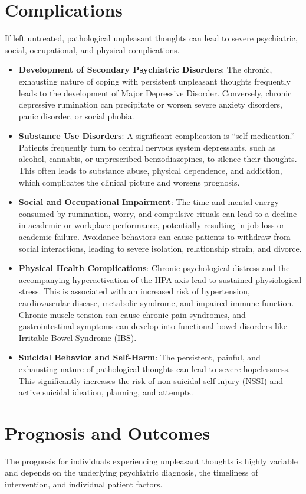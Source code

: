 \section*{Complications}
If left untreated, pathological unpleasant thoughts can lead to severe psychiatric, social, occupational, and physical complications.
\begin{itemize}
  \item \textbf{Development of Secondary Psychiatric Disorders}: The chronic, exhausting nature of coping with persistent unpleasant thoughts frequently leads to the development of Major Depressive Disorder. Conversely, chronic depressive rumination can precipitate or worsen severe anxiety disorders, panic disorder, or social phobia.
  \item \textbf{Substance Use Disorders}: A significant complication is ``self-medication.'' Patients frequently turn to central nervous system depressants, such as alcohol, cannabis, or unprescribed benzodiazepines, to silence their thoughts. This often leads to substance abuse, physical dependence, and addiction, which complicates the clinical picture and worsens prognosis.
  \item \textbf{Social and Occupational Impairment}: The time and mental energy consumed by rumination, worry, and compulsive rituals can lead to a decline in academic or workplace performance, potentially resulting in job loss or academic failure. Avoidance behaviors can cause patients to withdraw from social interactions, leading to severe isolation, relationship strain, and divorce.
  \item \textbf{Physical Health Complications}: Chronic psychological distress and the accompanying hyperactivation of the HPA axis lead to sustained physiological stress. This is associated with an increased risk of hypertension, cardiovascular disease, metabolic syndrome, and impaired immune function. Chronic muscle tension can cause chronic pain syndromes, and gastrointestinal symptoms can develop into functional bowel disorders like Irritable Bowel Syndrome (IBS).
  \item \textbf{Suicidal Behavior and Self-Harm}: The persistent, painful, and exhausting nature of pathological thoughts can lead to severe hopelessness. This significantly increases the risk of non-suicidal self-injury (NSSI) and active suicidal ideation, planning, and attempts.
\end{itemize}

\section*{Prognosis and Outcomes}
The prognosis for individuals experiencing unpleasant thoughts is highly variable and depends on the underlying psychiatric diagnosis, the timeliness of intervention, and individual patient factors.

